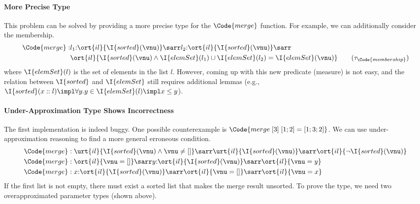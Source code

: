 \paragraph{More Precise Type} This problem can be solved by providing a more precise type for the $\Code{merge}$ function. For example, we can additionally consider the membership.
\begin{align*}
    \Code{merge} : &l_1{:}\ort{il}{\I{sorted}(\vnu)} \sarr l_2{:}\ort{il}{\I{sorted}(\vnu)} \sarr 
    \\&\ort{il}{\I{sorted}(\vnu) \land \I{elemSet}(l_1) \cup \I{elemSet}(l_2) = \I{elemSet}(\vnu)} \tag{$\tau_\Code{membership}$}
\end{align*}\noindent
where $\I{elemSet}(l)$ is the set of elements in the list $l$. However, coming up with this new predicate (measure) is not easy, and the relation between $\I{sorted}$ and $\I{elemSet}$ still requires additional lemmas (e.g., $\I{sorted}(x::l) \impl \forall y. y \in \I{elemSet}(l) \impl x \leq y$).

\paragraph{Under-Approximation Type Shows Incorrectness} The first implementation is indeed buggy. One possible counterexample is $\Code{merge\;[3]\;[1;2] = [1;3;2]}$. We can use under-approximation reasoning to find a more general erroneous condition.
\begin{align*}
    \Code{merge}& : \urt{il}{\I{sorted}(\vnu) \land \vnu \not= [] } \sarr \urt{il}{\I{sorted}(\vnu)} \sarr \ort{il}{\neg \I{sorted}(\vnu)}
    \\\Code{merge}& : \ort{il}{\vnu = [] } \sarr y{:}\ort{il}{\I{sorted}(\vnu)} \sarr \ort{il}{\vnu = y}
    \\\Code{merge}& : x{:}\ort{il}{\I{sorted}(\vnu)} \sarr \ort{il}{\vnu = []} \sarr \ort{il}{\vnu = x}
\end{align*}\noindent
If the first list is not empty, there must exist a sorted list that makes the merge result unsorted. To prove the type, we need two overapproximated parameter types (shown above).

